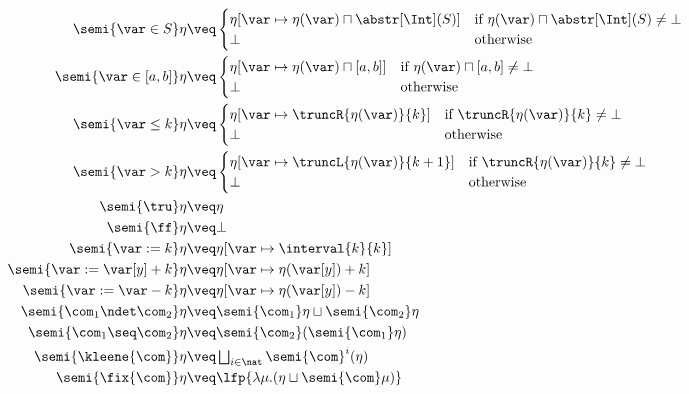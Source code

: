 \begin{align*}
  \semi{\var \in S}\eta 
  & \veq  
  \begin{cases}
    \eta[\var \mapsto \eta(\var)\sqcap \abstr[\Int](S)] & \text{if
    }\eta(\var)\sqcap \abstr[\Int](S)\neq \bot \\ \bot &
    \text{otherwise}
  \end{cases}\\
  \semi{\var \in [a,b]}\eta 
  & \veq
  \begin{cases}
    \eta[\var \mapsto \eta(\var)\sqcap [a,b]]  & \text{if }\eta(\var)\sqcap [a,b]\neq \bot \\
    \bot & \text{otherwise}
  \end{cases}\\
  \semi{\var \leq k}\eta 
  & \veq 
  \begin{cases}
    \eta[\var \mapsto \truncR{\eta(\var)}{k}] & \text{if }\truncR{\eta(\var)}{k}\neq \bot \\
    \bot & \text{otherwise}
  \end{cases}\\
  \semi{\var > k}\eta 
  & \veq 
  \begin{cases}
    \eta[\var \mapsto \truncL{\eta(\var)}{k+1}] & \text{if }\truncR{\eta(\var)}{k}\neq \bot \\
    \bot & \text{otherwise}
  \end{cases}\\
  \semi{\tru}\eta 
  & \veq \eta\\
  \semi{\ff}\eta 
  & \veq \bot\\
  \semi{\var := k}\eta 
  & \veq \eta[\var \mapsto \interval{k}{k}]\\
  \semi{\var := \var[y] + k}\eta 
  & \veq \eta[\var \mapsto \eta (\var[y]) + k]\\
  \semi{\var := \var - k}\eta 
  & \veq \eta[\var \mapsto \eta (\var[y]) - k]\\
  \semi{\com_1 \ndet \com_2} \eta
  & \veq \semi{\com_1} \eta \sqcup \semi{\com_2} \eta\\
  \semi{\com_1 \seq \com_2} \eta
  & \veq \semi{\com_2} (\semi{\com_1} \eta)\\
  \semi{\kleene{\com}} \eta
  & \veq \textstyle \bigsqcup_{i \in \nat} \semi{\com}^i (\eta)\\
  \semi{\fix{\com}} \eta
  & \veq  \lfp{\lambda \mu. (\eta \sqcup \semi{\com} \mu)}
\end{align*}

